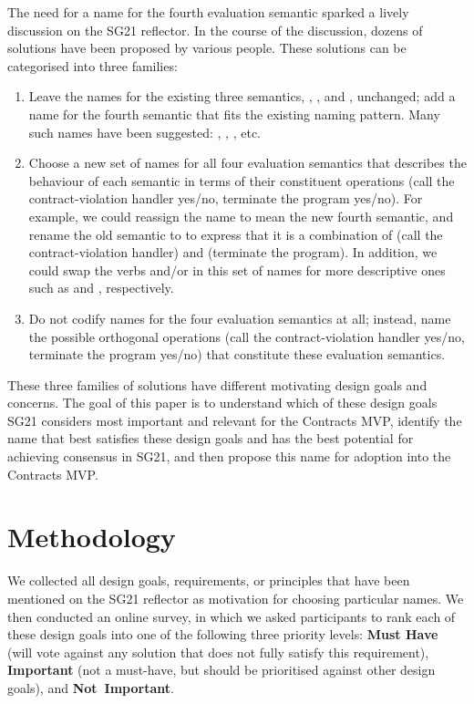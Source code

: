 The need for a name for the fourth evaluation semantic sparked a lively discussion on the SG21 reflector. In the course of the discussion, dozens of solutions have been proposed by various people. These solutions can be categorised into three families:
\renewcommand{\theenumi}{\Alph{enumi}}
\begin{enumerate}
\item Leave the names for the existing three semantics, , , and , unchanged; add a name for the fourth semantic that fits the existing naming pattern. Many such names have been suggested: , , , etc.
\item Choose a new set of names for all four evaluation semantics that describes the behaviour of each semantic in terms of their constituent operations (call the contract-violation handler yes/no, terminate the program yes/no). For example, we could reassign the name  to mean the new fourth semantic, and rename the old  semantic to \mbox{} to express that it is a combination of  (call the contract-violation handler) and  (terminate the program). In addition, we could swap  the verbs  and/or  in this set of names for more descriptive ones such as  and , respectively.
\item Do not codify names for the four evaluation semantics at all; instead, name the possible orthogonal operations (call the contract-violation handler yes/no, terminate the program yes/no) that constitute these evaluation semantics.
\end{enumerate}
These three families of solutions have different motivating design goals and concerns. The goal of this paper is to understand which of these design goals SG21 considers most important and relevant for the Contracts MVP, identify the name that best satisfies these design goals and has the best potential for achieving consensus in SG21, and then propose this name for adoption into the Contracts MVP.



\section{Methodology}
\label{sec:method}

We collected all design goals, requirements, or principles that have been mentioned on the SG21 reflector as motivation for choosing particular names. We then conducted an online survey, in which we asked participants to rank each of these design goals into one of the following three priority levels: \textbf{Must Have} (will vote against any solution that does not fully satisfy this requirement), \textbf{Important} (not a must-have, but should be prioritised against other design goals), and \mbox{\textbf{Not Important}}.

